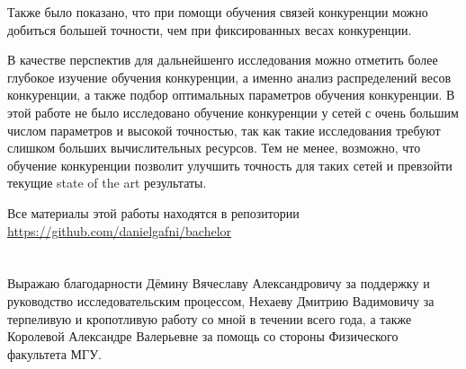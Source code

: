\documentclass[a4paper]{article}
\begin{document}
Также было показано, что при помощи обучения связей конкуренции можно добиться большей точности, чем при фиксированных весах конкуренции.

В качестве перспектив для дальнейшенго исследования можно отметить более глубокое изучение обучения конкуренции, а именно анализ распределений весов конкуренции, а также подбор оптимальных параметров обучения конкуренции. В этой работе не было исследовано обучение конкуренции у сетей с очень большим числом параметров и высокой точностью, так как такие исследования требуют слишком больших вычислительных ресурсов. Тем не менее, возможно, что обучение конкуренции позволит улучшить точность для таких сетей и превзойти текущие state of the art результаты.

\begin{center}
Все материалы этой работы находятся в репозитории\\
\href{https://github.com/danielgafni/bachelor}{https://github.com/danielgafni/bachelor} 
\end{center}

\clearpage 
 

\section{}
Выражаю благодарности Дёмину Вячеславу Александровичу за поддержку и руководство исследовательским процессом, Нехаеву Дмитрию Вадимовичу за терпеливую и кропотливую работу со мной в течении всего года, а также Королевой Александре Валерьевне за помощь со стороны Физического факультета МГУ.

\clearpage

\printbibliography
\end{document}
